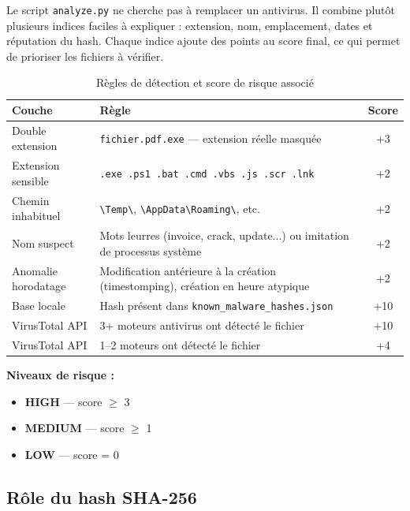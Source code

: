 \documentclass[12pt,a4paper]{article}
\begin{document}
Le script \texttt{analyze.py} ne cherche pas à remplacer un antivirus. Il combine plutôt plusieurs indices faciles à expliquer : extension, nom, emplacement, dates et réputation du hash. Chaque indice ajoute des points au score final, ce qui permet de prioriser les fichiers à vérifier.

\begin{table}[h!]
  \centering
  \begin{tabularx}{\textwidth}{lXc}
    \toprule
    \textbf{Couche} & \textbf{Règle} & \textbf{Score} \\
    \midrule
    Double extension     & \texttt{fichier.pdf.exe} — extension réelle masquée & +3 \\
    Extension sensible   & \texttt{.exe .ps1 .bat .cmd .vbs .js .scr .lnk}    & +2 \\
    Chemin inhabituel    & \texttt{\textbackslash{}Temp\textbackslash{}}, \texttt{\textbackslash{}AppData\textbackslash{}Roaming\textbackslash{}}, etc. & +2 \\
    Nom suspect          & Mots leurres (invoice, crack, update...) ou imitation de processus système & +2 \\
    Anomalie horodatage  & Modification antérieure à la création (timestomping), création en heure atypique & +2 \\
    \midrule
    Base locale          & Hash présent dans \texttt{known\_malware\_hashes.json}  & +10 \\
    VirusTotal API       & 3+ moteurs antivirus ont détecté le fichier             & +10 \\
    VirusTotal API       & 1--2 moteurs ont détecté le fichier                     & +4  \\
    \bottomrule
  \end{tabularx}
  \caption{Règles de détection et score de risque associé}
\end{table}

\textbf{Niveaux de risque :}
\begin{itemize}[noitemsep]
  \item \textbf{HIGH} — score $\geq$ 3
  \item \textbf{MEDIUM} — score $\geq$ 1
  \item \textbf{LOW} — score = 0
\end{itemize}

\subsection{Rôle du hash SHA-256}
\end{document}
